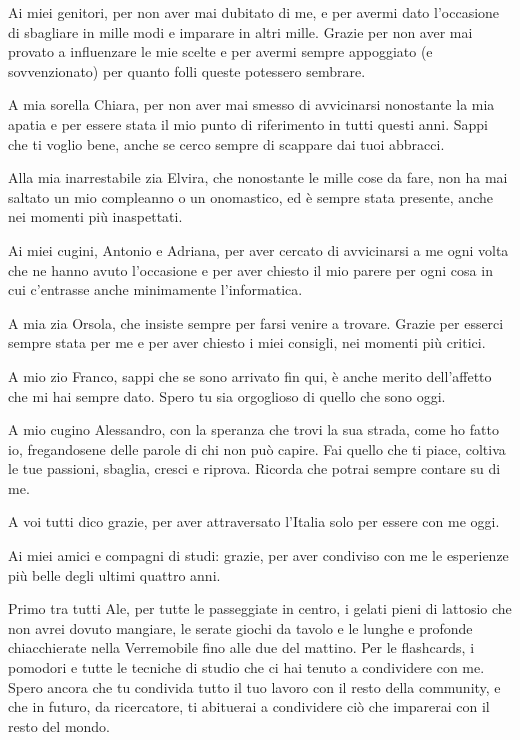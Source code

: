 \acknowledgements
Ai miei genitori, per non aver mai dubitato di me, e per avermi dato l'occasione di sbagliare in mille modi 
e imparare in altri mille.
Grazie per non aver mai provato a influenzare le mie scelte e per avermi sempre appoggiato (e sovvenzionato) 
per quanto folli queste potessero sembrare. 

A mia sorella Chiara, per non aver mai smesso di avvicinarsi nonostante la mia apatia e per essere stata il mio punto di riferimento 
in tutti questi anni. 
Sappi che ti voglio bene, anche se cerco sempre di scappare dai tuoi abbracci. 

Alla mia inarrestabile zia Elvira, che nonostante le mille cose da fare, non ha mai saltato un mio compleanno o un onomastico, 
ed è sempre stata presente, anche nei momenti più inaspettati. 

Ai miei cugini, Antonio e Adriana, per aver cercato di avvicinarsi a me ogni volta che ne hanno avuto l'occasione e per aver 
chiesto il mio parere per ogni cosa in cui c'entrasse anche minimamente l'informatica. 

A mia zia Orsola, che insiste sempre per farsi venire a trovare. Grazie per esserci sempre stata per me e per aver chiesto i miei 
consigli, nei momenti più critici.

A mio zio Franco, sappi che se sono arrivato fin qui, è anche merito dell'affetto che mi hai sempre dato.
Spero tu sia orgoglioso di quello che sono oggi.

A mio cugino Alessandro, con la speranza che trovi la sua strada, come ho fatto io, fregandosene delle parole di chi non può capire.
Fai quello che ti piace, coltiva le tue passioni, sbaglia, cresci e riprova. Ricorda che potrai sempre contare su di me.

A voi tutti dico grazie, per aver attraversato l'Italia solo per essere con me oggi.

\clearpage

Ai miei amici e compagni di studi:
grazie, per aver condiviso con me le esperienze più belle degli ultimi quattro anni.

Primo tra tutti Ale, per tutte le passeggiate in centro, i gelati pieni di lattosio che non avrei dovuto mangiare, le serate 
giochi da tavolo e le lunghe e profonde chiacchierate nella Verremobile fino alle due del mattino.
Per le flashcards, i pomodori e tutte le tecniche di studio che ci hai tenuto a condividere con me.
Spero ancora che tu condivida tutto il tuo lavoro con il resto della community, e che in futuro, da ricercatore, ti abituerai a 
condividere ciò che imparerai con il resto del mondo. 

